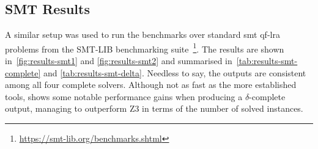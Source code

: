\documentclass[runningheads]{llncs}
\begin{document}
\subsection*{SMT Results}

A similar setup was used to run the benchmarks over standard \gls{smt} \gls{qf-lra} problems from the SMT-LIB benchmarking suite~\footnote{\url{https://smt-lib.org/benchmarks.shtml}}.
The results are shown in~\autoref{fig:results-smt1} and \autoref{fig:results-smt2} and summarised in~\autoref{tab:results-smt-complete} and \autoref{tab:results-smt-delta}.
Needless to say, the outputs are consistent among all four complete solvers.
Although not as fast as the more established tools, \dlinear shows some notable performance gains when producing a $\delta$-complete output, managing to outperform Z3 in terms of the number of solved instances.
\end{document}
